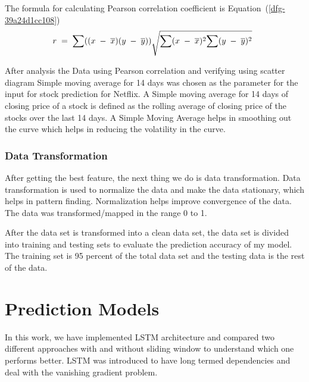 \documentclass[5p,,preprint,12pt,twocolumn]{elsarticle}
\begin{document}
The formula for calculating Pearson correlation coefficient is Equation~(\ref{dfg-39a24d1cc108})
\let\saveeqnno\theequation
\let\savefrac\frac
\def\dispfrac{\displaystyle\savefrac}
\begin{eqnarray}
\let\frac\dispfrac
\gdef\theequation{1}
\let\theHequation\theequation
\label{dfg-39a24d1cc108}
\begin{array}{@{}l}r\;=\;\frac{\sum_{}((x\;-\;\overline x)(y\;-\;\overline y))}{\sqrt{{\displaystyle\sum_{}}(x\;-\;\overline x)^{2}{\displaystyle\sum_{}}(y\;-\;\overline y)^{2}}}\end{array}
\end{eqnarray}
\global\let\theequation\saveeqnno
\addtocounter{equation}{-1}\ignorespaces 
After analysis the Data using Pearson correlation and verifying using scatter diagram Simple moving average for 14 days was chosen as the parameter for the input for stock prediction for Netflix. A Simple moving average for 14 days of closing price of a stock is defined as the rolling average of closing price of the stocks over the last 14 days. A Simple Moving Average helps in smoothing out the curve which helps in reducing the volatility in the curve.



\subsubsection{Data Transformation}After getting the best feature, the next thing we do is data transformation. Data transformation is used to normalize the data and make the data stationary, which helps in pattern finding. Normalization helps improve convergence of the data. The data was transformed/mapped in the range 0 to 1.

After the data set is transformed into a clean data set, the data set is divided into training and testing sets to evaluate the prediction accuracy of my model. The training set is 95 percent of the total data set and the testing data is the rest of the data.
    
\section{Prediction Models}
In this work, we have implemented LSTM architecture and compared two different approaches with and without sliding window to understand which one performs better. LSTM was introduced to have long termed dependencies and deal with the vanishing gradient problem.
\end{document}
